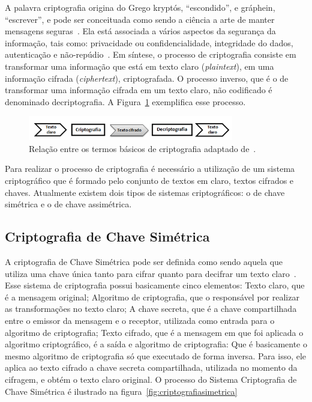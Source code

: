 A palavra criptografia origina do Grego kryptós, ``escondido'', e gráphein, ``escrever'',  e pode ser  conceituada como sendo a ciência a arte de manter mensagens seguras~\cite{Schneier1995}. Ela está  associada a vários aspectos da segurança da informação, tais como: privacidade ou confidencialidade, integridade do dados, autenticação e não-repúdio~\cite{Menezes1996}. Em síntese, o processo de criptografia consiste em transformar uma informação que está em texto claro (\emph{plaintext}), em uma informação cifrada (\emph{ciphertext}), criptografada. O processo inverso, que é o de transformar uma informação cifrada em um texto claro, não codificado é denominado decriptografia. A Figura~\ref{fig:processocriptografia} exemplifica esse processo.

\begin{figure}[!htb]
\centering
\includegraphics[width=0.8\textwidth]{processocriptografia.png}
\caption{Relação entre os termos  básicos de criptografia adaptado de~\cite{Schneier1995}.}
\label{fig:processocriptografia}
\end{figure}

Para realizar o processo de criptografia é necessário a utilização de um sistema criptográfico que é formado pelo conjunto de textos em claro, textos cifrados e chaves. Atualmente existem dois tipos de sistemas criptográficos: o de chave simétrica e o de chave assimétrica.

\subsection{Criptografia de Chave Simétrica}

A criptografia de Chave Simétrica pode ser definida como sendo aquela que utiliza uma chave única tanto para cifrar quanto para decifrar um texto claro~\cite{stallings2008}. Esse sistema de criptografia possui basicamente cinco elementos: Texto claro, que é a mensagem original; Algoritmo de criptografia, que o responsável por realizar as transformações no texto claro; A chave secreta, que é a chave compartilhada entre o emissor da mensagem e o receptor, utilizada como entrada para o algoritmo de criptografia; Texto cifrado, que é a mensagem em que foi aplicada o algoritmo criptográfico, é a saída e algoritmo de criptografia: Que é basicamente o mesmo algoritmo de criptografia só que executado de forma inversa. Para isso, ele aplica ao texto cifrado a chave secreta compartilhada, utilizada no momento da cifragem, e obtém o texto claro original. O processo do Sistema Criptografia de Chave Simétrica é ilustrado na figura~\ref{fig:criptografiasimetrica}


